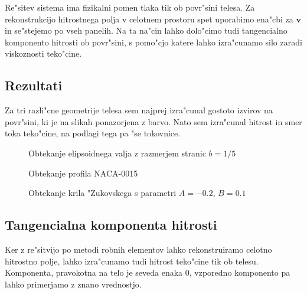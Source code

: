 \documentclass[a4paper,10pt]{article}
\renewcommand{\vec}{\mathbf}
\begin{document}
Re"sitev sistema ima fizikalni pomen tlaka tik ob povr"sini telesa. Za rekonstrukcijo hitrostnega polja v celotnem prostoru spet uporabimo ena"cbi za $\vec v$ in se"stejemo po vseh panelih. Na ta na"cin lahko dolo"cimo tudi tangencialno komponento hitrosti ob povr"sini, s pomo"cjo katere lahko izra"cunamo silo zaradi viskoznosti teko"cine. 

\subsection{Rezultati}

Za tri razli"cne geometrije telesa sem najprej izra"cunal gostoto izvirov na povr"sini, ki je na slikah ponazorjena z barvo. Nato sem izra"cunal hitrost in smer toka teko"cine, na podlagi tega pa "se tokovnice. 

\begin{figure}
 \subfigure{}
 \subfigure{}
 \caption{Obtekanje elipsoidnega valja z razmerjem stranic $b = 1/5$}
 \label{fig:elipsoid}
\end{figure}

\begin{figure}
 \subfigure{}
 \subfigure{}
 \caption{Obtekanje profila NACA-0015}
 \label{fig:naca}
\end{figure}

\begin{figure}
 \subfigure{}
 \subfigure{}
 \caption{Obtekanje krila "Zukovskega s parametri $A=-0.2$, $B = 0.1$}
 \label{fig:zukovski}
\end{figure}

\subsection{Tangencialna komponenta hitrosti}

Ker z re"sitvijo po metodi robnih elementov lahko rekonstruiramo celotno hitrostno polje, lahko izra"cunamo tudi hitrost teko"cine tik ob telesu. Komponenta, pravokotna na telo je seveda enaka 0, vzporedno komponento pa lahko primerjamo z znano vrednostjo. 
\end{document}
